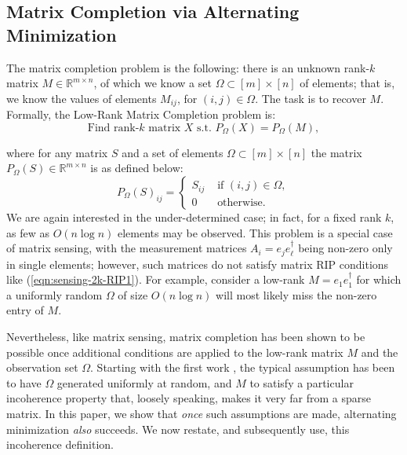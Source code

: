\documentclass[11pt]{article}
\theoremstyle{plain}
\theoremstyle{definition}
\begin{document}
\subsection*{Matrix Completion via Alternating Minimization}
The matrix completion problem is the following: there is an unknown rank-$k$ matrix $M\in \mathbb{R}^{m\times n}$, of which we know a set $\Omega \subset [m]\times [n]$ of elements; that is, we know the values of elements $M_{ij}$, for $(i,j)\in\Omega$. The task is to recover $M$. Formally, the Low-Rank Matrix Completion problem is:\renewcommand{\theequation}{LRMC}
\begin{equation}
\mbox{Find rank-}k \mbox{ matrix } X \mbox{ s.t. }  P_\Omega(X)=P_\Omega(M),\label{eq:matcomp}
 \end{equation} \renewcommand{\theequation}{\arabic{equation}} \addtocounter{equation}{-1}
where for any matrix $S$ and a set of elements $\Omega \subset [m]\times [n]$ the matrix $P_\Omega(S)\in \mathbb{R}^{m\times n}$ is as defined below:
\begin{equation}
  P_\Omega(S)_{ij}=\begin{cases}S_{ij}&\mbox{ if }(i,j)\in \Omega,
\\ 0&\mbox{ otherwise.}
\end{cases}\label{eq:pomega}
\end{equation}
We are again interested in the under-determined case; in fact, for a fixed rank $k$, as few as $O(n\log n)$ elements may be observed. This problem is a special case of matrix sensing, with the measurement matrices $A_i=e_je_\ell^\dag$ being non-zero only in single elements; however, such matrices do not satisfy  matrix RIP conditions like (\ref{eqn:sensing-2k-RIP1}). For example, consider a low-rank $M=e_1e_1^\dag$ for which a uniformly random $\Omega$ of size $O(n\log n)$ will most likely miss the non-zero entry of $M$.

Nevertheless, like matrix sensing, matrix completion has been shown to be possible once additional conditions are applied to the low-rank matrix $M$ and the observation set $\Omega$. Starting with the first work \cite{CandesR2007}, the typical assumption has been to have $\Omega$ generated uniformly at random, and $M$ to satisfy a particular incoherence property that, loosely speaking, makes it very far from a sparse matrix. In this paper, we show that {\em once} such assumptions are made, alternating minimization {\em also} succeeds. We now restate, and subsequently use, this incoherence definition.
\end{document}

